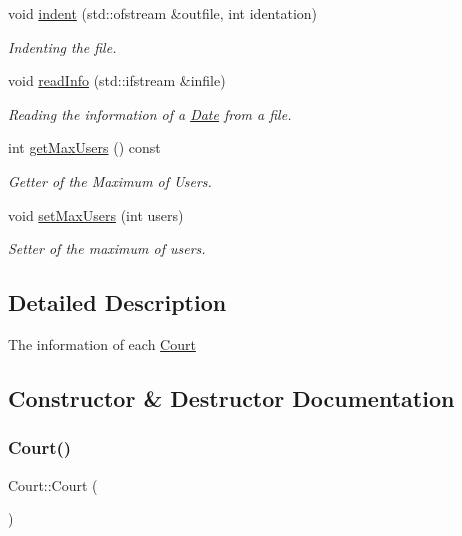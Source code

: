 \begin{DoxyCompactItemize}
void \mbox{\hyperlink{class_court_ae08f3e2f1119073fffc251fc1e725550}{indent}} (std\+::ofstream \&outfile, int identation)
\begin{DoxyCompactList}\small\item\em Indenting the file. \end{DoxyCompactList}\item 
void \mbox{\hyperlink{class_court_a2d801d3edd9d0280ef0420b131e07f2e}{read\+Info}} (std\+::ifstream \&infile)
\begin{DoxyCompactList}\small\item\em Reading the information of a \mbox{\hyperlink{class_date}{Date}} from a file. \end{DoxyCompactList}\item 
int \mbox{\hyperlink{class_court_a9992ef2a5d2ee81e8cc7f24f8c917f31}{get\+Max\+Users}} () const
\begin{DoxyCompactList}\small\item\em Getter of the Maximum of Users. \end{DoxyCompactList}\item 
void \mbox{\hyperlink{class_court_ae44417638404c3caf4579104e633a2f4}{set\+Max\+Users}} (int users)
\begin{DoxyCompactList}\small\item\em Setter of the maximum of users. \end{DoxyCompactList}\end{DoxyCompactItemize}


\subsection{Detailed Description}
The information of each \mbox{\hyperlink{class_court}{Court}} 

\subsection{Constructor \& Destructor Documentation}
\mbox{\label{class_court_a786e4db0ebf50a5aec5bfe0cca58b06a}} 
\subsubsection{\texorpdfstring{Court()}{Court()}\hspace{0.1cm}{\footnotesize\ttfamily [1/2]}}
{\footnotesize\ttfamily Court\+::\+Court (\begin{DoxyParamCaption}{ }\end{DoxyParamCaption})}



